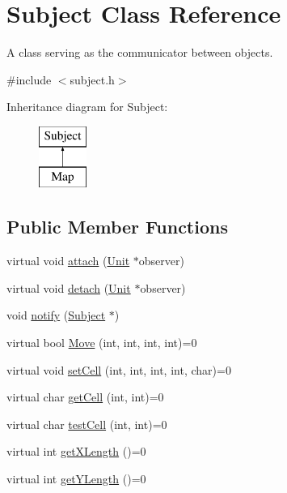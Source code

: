 \hypertarget{class_subject}{\section{\-Subject \-Class \-Reference}
\label{class_subject}
}


\-A class serving as the communicator between objects.  




{\ttfamily \#include $<$subject.\-h$>$}

\-Inheritance diagram for \-Subject\-:\begin{figure}[H]
\begin{center}
\leavevmode
\includegraphics[height=2.000000cm]{class_subject}
\end{center}
\end{figure}
\subsection*{\-Public \-Member \-Functions}
\begin{DoxyCompactItemize}
\item 
virtual void \hyperlink{class_subject_afc0ec46c6ef16c1cf24b2e512c2261be}{attach} (\hyperlink{class_unit}{\-Unit} $\ast$observer)
\item 
virtual void \hyperlink{class_subject_adf94e5dc7e4e444a02349421f06301ab}{detach} (\hyperlink{class_unit}{\-Unit} $\ast$observer)
\item 
void \hyperlink{class_subject_a31874efc39347a6510749f1b3c6c8aea}{notify} (\hyperlink{class_subject}{\-Subject} $\ast$)
\item 
virtual bool \hyperlink{class_subject_aa767b1d8255245f0955a8aa469b35f3a}{\-Move} (int, int, int, int)=0
\item 
virtual void \hyperlink{class_subject_a3e8c4e46252ea6eec4ab1f2a72b74e77}{set\-Cell} (int, int, int, int, char)=0
\item 
virtual char \hyperlink{class_subject_a6ef90adc577f3d6476b451ab69a5a3c6}{get\-Cell} (int, int)=0
\item 
virtual char \hyperlink{class_subject_adac09d62a1198bf898a4d191402a3dc4}{test\-Cell} (int, int)=0
\item 
virtual int \hyperlink{class_subject_aac54fd606aba88a7ef627f573cc812a0}{get\-X\-Length} ()=0
\item 
virtual int \hyperlink{class_subject_a5ee45d72d8fbf5d208629fc4ddf2b5fc}{get\-Y\-Length} ()=0
\end{DoxyCompactItemize}


